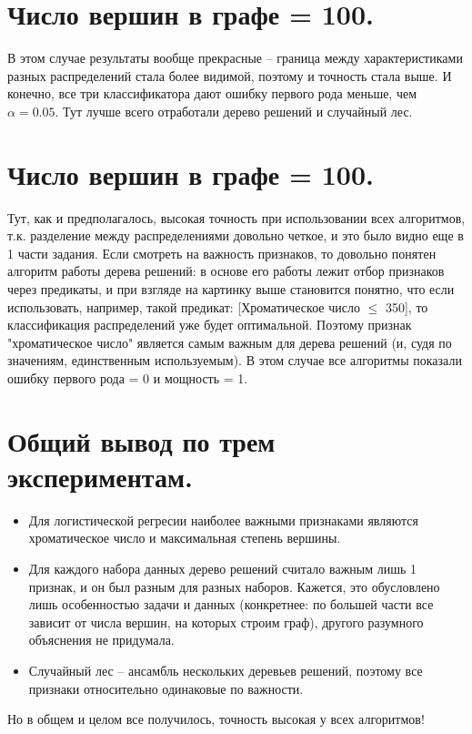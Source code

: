 \documentclass{report}
\begin{document}
\section{Число вершин в графе = 100.}
В этом случае результаты вообще прекрасные -- граница между характеристиками разных распределений стала более видимой, поэтому и точность стала выше.
\newline
\newline
И конечно, все три классификатора дают ошибку первого рода меньше, чем $\alpha = 0.05$.
\newline
\newline
Тут лучше всего отработали дерево решений и случайный лес.

\section{Число вершин в графе = 100.}
Тут, как и предполагалось, высокая точность при использовании всех алгоритмов, т.к. разделение между распределениями довольно четкое, и это было видно еще в 1 части задания.
\newline
\newline
Если смотреть на важность признаков, то довольно понятен алгоритм работы дерева решений: в основе его работы лежит отбор признаков через предикаты, и при взгляде на картинку выше становится понятно, что если использовать, например, такой предикат: [Хроматическое число $\leq$ 350], то классификация распределений уже будет оптимальной. Поэтому признак "хроматическое число" является самым важным для дерева решений (и, судя по значениям, единственным используемым).
\newline
\newline
В этом случае все алгоритмы показали ошибку первого рода = 0 и мощность = 1.

\section{Общий вывод по трем экспериментам.}
\begin{itemize}
    \item Для логистической регресии наиболее важными признаками являются хроматическое число и максимальная степень вершины.
    \item Для каждого набора данных дерево решений считало важным лишь 1 признак, и он был разным для разных наборов. Кажется, это обусловлено лишь особенностью задачи и данных (конкретнее: по большей части все зависит от числа вершин, на которых строим граф), другого разумного объяснения не придумала.
    \item Случайный лес -- ансамбль нескольких деревьев решений, поэтому все признаки относительно одинаковые по важности.
\end{itemize}
Но в общем и целом все получилось, точность высокая у всех алгоритмов!
\end{document}
